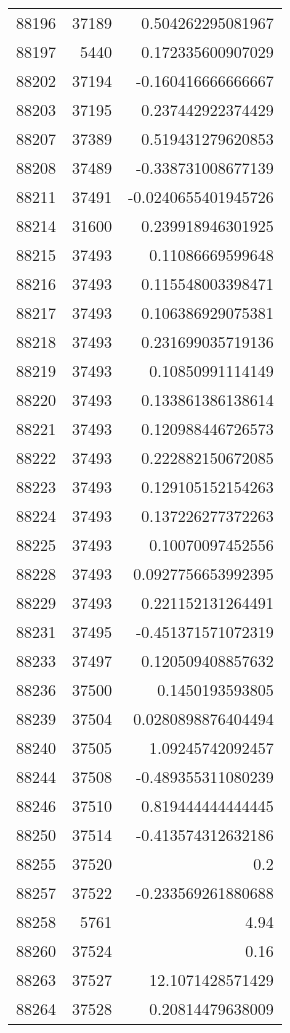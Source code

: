 \begin{tabular}{r | r | r}
88196 & 37189 & 0.504262295081967 \\
88197 & 5440 & 0.172335600907029 \\
88202 & 37194 & -0.160416666666667 \\
88203 & 37195 & 0.237442922374429 \\
88207 & 37389 & 0.519431279620853 \\
88208 & 37489 & -0.338731008677139 \\
88211 & 37491 & -0.0240655401945726 \\
88214 & 31600 & 0.239918946301925 \\
88215 & 37493 & 0.11086669599648 \\
88216 & 37493 & 0.115548003398471 \\
88217 & 37493 & 0.106386929075381 \\
88218 & 37493 & 0.231699035719136 \\
88219 & 37493 & 0.10850991114149 \\
88220 & 37493 & 0.133861386138614 \\
88221 & 37493 & 0.120988446726573 \\
88222 & 37493 & 0.222882150672085 \\
88223 & 37493 & 0.129105152154263 \\
88224 & 37493 & 0.137226277372263 \\
88225 & 37493 & 0.10070097452556 \\
88228 & 37493 & 0.0927756653992395 \\
88229 & 37493 & 0.221152131264491 \\
88231 & 37495 & -0.451371571072319 \\
88233 & 37497 & 0.120509408857632 \\
88236 & 37500 & 0.1450193593805 \\
88239 & 37504 & 0.0280898876404494 \\
88240 & 37505 & 1.09245742092457 \\
88244 & 37508 & -0.489355311080239 \\
88246 & 37510 & 0.819444444444445 \\
88250 & 37514 & -0.413574312632186 \\
88255 & 37520 & 0.2 \\
88257 & 37522 & -0.233569261880688 \\
88258 & 5761 & 4.94 \\
88260 & 37524 & 0.16 \\
88263 & 37527 & 12.1071428571429 \\
88264 & 37528 & 0.20814479638009 \\

\end{tabular}
